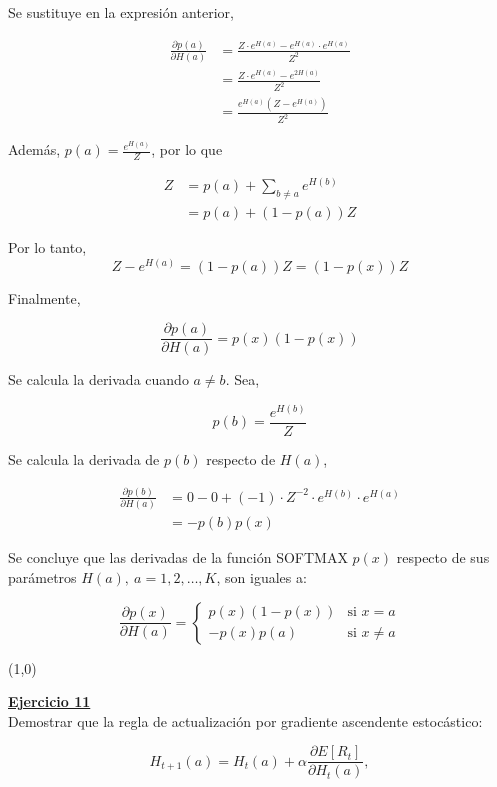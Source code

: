 \documentclass[12pt]{article}
\newlength\tindent
\renewcommand{\indent}{\hspace*{\tindent}}
\begin{document}
\begin{itemize}
    Se sustituye en la expresión anterior,

    \begin{align*}
        \frac{\partial p(a)}{\partial H(a)} &= \frac{Z\cdot e^{H(a)} - e^{H(a)}\cdot e^{H(a)}}{Z^2} \\
        &= \frac{Z\cdot e^{H(a)} - e^{2H(a)}}{Z^2} \\
        &= \frac{e^{H(a)}(Z - e^{H(a)})}{Z^2}
    \end{align*}

    Además, $p(a) = \frac{e^{H(a)}}{Z}$, por lo que

    \begin{align*}
        Z &= p(a) + \sum_{b\neq a} e^{H(b)} \\
        &= p(a) + (1-p(a))Z
    \end{align*}

    Por lo tanto,
    \[
        Z - e^{H(a)} = (1-p(a))Z = (1-p(x))Z
    \]

    Finalmente,

    \[
        \frac{\partial p(a)}{\partial H(a)} = p(x)(1-p(x))
    \]

    Se calcula la derivada cuando $a\neq b$.
    Sea,

    \[
        p(b) = \frac{e^{H(b)}}{Z}
    \]

    Se calcula la derivada de $p(b)$ respecto de $H(a)$,

    \begin{align*}
        \frac{\partial p(b)}{\partial H(a)} &= 0 -0 + (-1) \cdot Z^{-2} \cdot e^{H(b)} \cdot e^{H(a)} \\
        &= -p(b)p(x)
    \end{align*}

    Se concluye que las derivadas de la función SOFTMAX $p(x)$ respecto de sus parámetros $H(a),\ a=1,2,\dots,K$, son iguales a:

    \[
        \frac{\partial p(x)}{\partial H(a)} =
        \begin{cases}
            p(x)(1-p(x))    &\text{si $x = a$} \\
            -p(x)p(a)       &\text{si $x\neq a$}
        \end{cases}
    \]

    \line(1,0){\textwidth}

    \indent\underline{\textbf{Ejercicio 11}}\\
    Demostrar que la regla de actualización por gradiente ascendente estocástico:

    \[
        H_{t+1}(a) = H_t (a) + \alpha \frac{\partial E[R_t] }{\partial H_t(a)},
    \]


\end{itemize}
\end{document}
